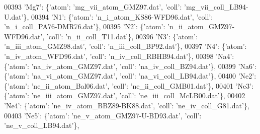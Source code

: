 \begin{DoxyCode}
00393                              \textcolor{stringliteral}{'Mg7'}: \{\textcolor{stringliteral}{'atom'}: \textcolor{stringliteral}{'mg\_vii\_atom\_GMZ97.dat'}, \textcolor{stringliteral}{'coll'}: \textcolor{stringliteral}{'mg\_vii\_coll\_LB94-U.dat'}\},
00394                              \textcolor{stringliteral}{'N1'}: \{\textcolor{stringliteral}{'atom'}: \textcolor{stringliteral}{'n\_i\_atom\_KS86-WFD96.dat'}, \textcolor{stringliteral}{'coll'}: \textcolor{stringliteral}{'n\_i\_coll\_PA76-DMR76.dat'}\},
00395                              \textcolor{stringliteral}{'N2'}: \{\textcolor{stringliteral}{'atom'}: \textcolor{stringliteral}{'n\_ii\_atom\_GMZ97-WFD96.dat'}, \textcolor{stringliteral}{'coll'}: \textcolor{stringliteral}{'n\_ii\_coll\_T11.dat'}\},
00396                              \textcolor{stringliteral}{'N3'}: \{\textcolor{stringliteral}{'atom'}: \textcolor{stringliteral}{'n\_iii\_atom\_GMZ98.dat'}, \textcolor{stringliteral}{'coll'}: \textcolor{stringliteral}{'n\_iii\_coll\_BP92.dat'}\},
00397                              \textcolor{stringliteral}{'N4'}: \{\textcolor{stringliteral}{'atom'}: \textcolor{stringliteral}{'n\_iv\_atom\_WFD96.dat'}, \textcolor{stringliteral}{'coll'}: \textcolor{stringliteral}{'n\_iv\_coll\_RBHB94.dat'}\},
00398                              \textcolor{stringliteral}{'Na4'}: \{\textcolor{stringliteral}{'atom'}: \textcolor{stringliteral}{'na\_iv\_atom\_GMZ97.dat'}, \textcolor{stringliteral}{'coll'}: \textcolor{stringliteral}{'na\_iv\_coll\_BZ94.dat'}\},
00399                              \textcolor{stringliteral}{'Na6'}: \{\textcolor{stringliteral}{'atom'}: \textcolor{stringliteral}{'na\_vi\_atom\_GMZ97.dat'}, \textcolor{stringliteral}{'coll'}: \textcolor{stringliteral}{'na\_vi\_coll\_LB94.dat'}\},
00400                              \textcolor{stringliteral}{'Ne2'}: \{\textcolor{stringliteral}{'atom'}: \textcolor{stringliteral}{'ne\_ii\_atom\_Bal06.dat'}, \textcolor{stringliteral}{'coll'}: \textcolor{stringliteral}{'ne\_ii\_coll\_GMB01.dat'}\},
00401                              \textcolor{stringliteral}{'Ne3'}: \{\textcolor{stringliteral}{'atom'}: \textcolor{stringliteral}{'ne\_iii\_atom\_GMZ97.dat'}, \textcolor{stringliteral}{'coll'}: \textcolor{stringliteral}{'ne\_iii\_coll\_McLB00.dat'}\},
00402                              \textcolor{stringliteral}{'Ne4'}: \{\textcolor{stringliteral}{'atom'}: \textcolor{stringliteral}{'ne\_iv\_atom\_BBZ89-BK88.dat'}, \textcolor{stringliteral}{'coll'}: \textcolor{stringliteral}{'ne\_iv\_coll\_G81.dat'}\},
00403                              \textcolor{stringliteral}{'Ne5'}: \{\textcolor{stringliteral}{'atom'}: \textcolor{stringliteral}{'ne\_v\_atom\_GMZ97-U-BD93.dat'}, \textcolor{stringliteral}{'coll'}: \textcolor{stringliteral}{'ne\_v\_coll\_LB94.dat'}\},

\end{DoxyCode}
